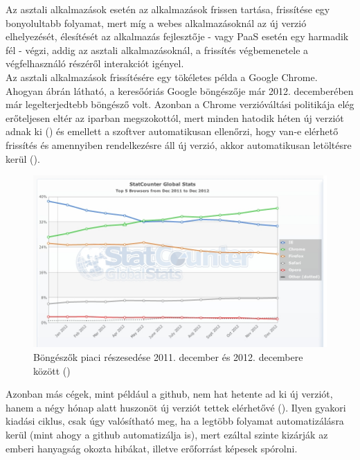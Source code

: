 
Az asztali alkalmazások esetén az alkalmazások frissen tartása, frissítése egy bonyolultabb folyamat, mert míg a webes alkalmazásoknál az új verzió elhelyezését, élesítését az alkalmazás fejlesztője - vagy PaaS esetén egy harmadik fél - végzi, addig az asztali alkalmazásoknál, a frissítés végbemenetele a végfelhasználó részéről interakciót igényel.
\hfill\\
Az asztali alkalmazások frissítésére egy tökéletes példa a Google Chrome. Ahogyan  ábrán látható, a keresőóriás Google böngészője már 2012. decemberében már legelterjedtebb böngésző volt. Azonban a Chrome verzióváltási politikája elég erőteljesen eltér az iparban megszokottól, mert minden hatodik héten új verziót adnak ki (\cite{chrome_six_weeks}) és emellett a szoftver automatikusan ellenőrzi, hogy van-e elérhető frissítés és amennyiben rendelkezésre áll új verzió, akkor automatikusan letöltésre kerül (\cite{google_chrome_autoupdate}).

\begin{figure}[ht]
	\centering
		\includegraphics[scale=0.5]{assets/statcounter_browser_2011_dec-2012_dec.jpg}%
		\caption[DUMMY]%
		{Böngészők piaci részesedése 2011. december és 2012. decembere között (\cite{statcounter_browser})}%
		\label{fig:statcounter_browser}
\end{figure}

Azonban más cégek, mint például a github, nem hat hetente ad ki új verziót, hanem a négy hónap alatt huszonöt új verziót tettek elérhetővé (\cite{github_deployment_windows}). Ilyen gyakori kiadási ciklus, csak úgy valósítható meg, ha a legtöbb folyamat automatizálásra kerül (mint ahogy a github automatizálja is), mert ezáltal szinte kizárják az emberi hanyagság okozta hibákat, illetve erőforrást képesek spórolni.


